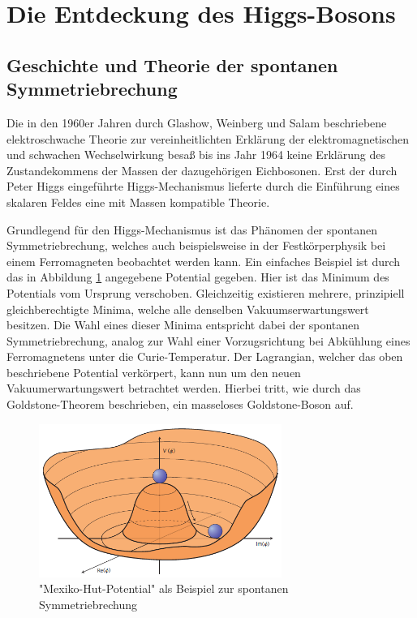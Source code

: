 
\section{Die Entdeckung des Higgs-Bosons}


\subsection{Geschichte und Theorie der spontanen Symmetriebrechung}
Die in den 1960er Jahren durch Glashow, Weinberg und Salam beschriebene elektroschwache Theorie zur vereinheitlichten Erklärung der elektromagnetischen und schwachen Wechselwirkung besaß bis ins Jahr 1964 keine Erklärung des Zustandekommens der Massen der dazugehörigen Eichbosonen.
Erst der durch Peter Higgs eingeführte Higgs-Mechanismus lieferte durch die Einführung eines skalaren Feldes eine mit Massen kompatible Theorie.

Grundlegend für den Higgs-Mechanismus ist das Phänomen der spontanen Symmetriebrechung, welches auch beispielsweise in der Festkörperphysik bei einem Ferromagneten beobachtet werden kann.
Ein einfaches Beispiel ist durch das in Abbildung \ref{fig:higgs} angegebene Potential gegeben.
Hier ist das Minimum des Potentials vom Ursprung verschoben.
Gleichzeitig existieren mehrere, prinzipiell gleichberechtigte Minima, welche alle denselben Vakuumserwartungswert besitzen.
Die Wahl eines dieser Minima entspricht dabei der spontanen Symmetriebrechung, analog zur Wahl einer Vorzugsrichtung bei Abkühlung eines Ferromagnetens unter die Curie-Temperatur.
Der Lagrangian, welcher das oben beschriebene Potential verkörpert, kann nun um den neuen Vakuumerwartungswert betrachtet werden.
Hierbei tritt, wie durch das Goldstone-Theorem beschrieben, ein masseloses Goldstone-Boson auf.

\begin{figure}
  \centering
  \includegraphics[height=5.0cm]{ressources/higgspotential.png}
  \caption{"Mexiko-Hut-Potential" als Beispiel zur spontanen Symmetriebrechung \cite{Ellis:2012465}}
  \label{fig:higgs}
\end{figure}

